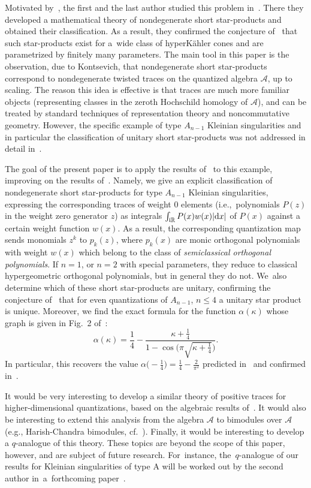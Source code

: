 \documentclass[pdftex]{sigma}
\newcommand{\mc}[1]{\mathcal{#1}}
\theoremstyle{definition}
\numberwithin{equation}{section}
\begin{document}
Motivated by~\cite{BPR}, the first and the last author studied this problem in~\cite{ES}. There they developed a mathematical theory of nondegenerate short star-products and obtained their classification. As a result, they confirmed the conjecture of~\cite{BPR} that such star-products exist for a~wide class of hyperK\"ahler cones and are parametrized by finitely many parameters. The main tool in this paper is the observation, due to Kontsevich, that nondegenerate short star-products correspond to nondegenerate twisted traces on the quantized algebra $\mathcal A$, up to scaling. The reason this idea is effective is that traces are much more familiar objects (representing classes in the zeroth Hochschild homology of $\mathcal{A}$), and can be treated by standard techniques of representation theory and noncommutative geometry. However, the specific example of type $A_{n-1}$ Kleinian singularities and in particular the classification of unitary short star-products was not addressed in detail in~\cite{ES}.

The goal of the present paper is to apply the results of~\cite{ES} to this example, improving on the results of~\cite{BPR}. Namely, we give an explicit classification of nondegenerate short star-products for type $A_{n-1}$ Kleinian singularities, expressing the corresponding traces of weight $0$ elements (i.e.,~polynomials $P(z)$ in the weight zero generator $z$) as integrals $\int_{{\rm i}\mathbb R} P(x)w(x)|{\rm d}x|$ of $P(x)$ against a certain weight function $w(x)$. As a result, the corresponding quantization map sends monomials $z^k$ to $p_k(z)$, where $p_k(x)$ are monic orthogonal polynomials with weight $w(x)$ which belong to the class of {\it semiclassical orthogonal polynomials}. If $n=1$, or $n=2$ with special parameters, they reduce to classical hypergeometric orthogonal polynomials, but in general they do not. We~also determine which of these short star-products are unitary, confirming the conjecture of~\cite{BPR} that for even quantizations of $A_{n-1}$, $n\le 4$ a unitary star product is unique. Moreover, we find the exact formula for the function $\alpha(\kappa)$ whose graph is given in Fig.~2 of~\cite{BPR}:
\[
\alpha(\kappa)=\frac{1}{4}-\frac{\kappa+\frac{1}{4}}{1-\cos\big(\pi\sqrt{\kappa+\frac{1}{4}}\big)}.
\]
In particular, this recovers the value $\alpha\big({-}\frac{1}{4}\big)=\frac{1}{4}-\frac{2}{\pi^2}$ predicted in~\cite{BPR} and confirmed \mbox{in~\cite{DFPY,DPY}}.

It would be very interesting to develop a similar theory of positive traces for higher-dimen\-sio\-nal quantizations, based on the algebraic results of~\cite{ES}. It would also be interesting to extend this analysis from the algebra $\mc A$ to bimodules over $\mc A$ (e.g., Harish-Chandra bimodules, cf.~\cite{L}). Finally, it would be interesting to develop a $q$-analogue of this theory.
These topics are beyond the scope of this paper, however, and are subject of future research. For~instance, the~$q$-analogue of our results for Kleinian singularities of type A will be worked out by the second author in~a~forthcoming paper~\cite{K2}.
\end{document}

